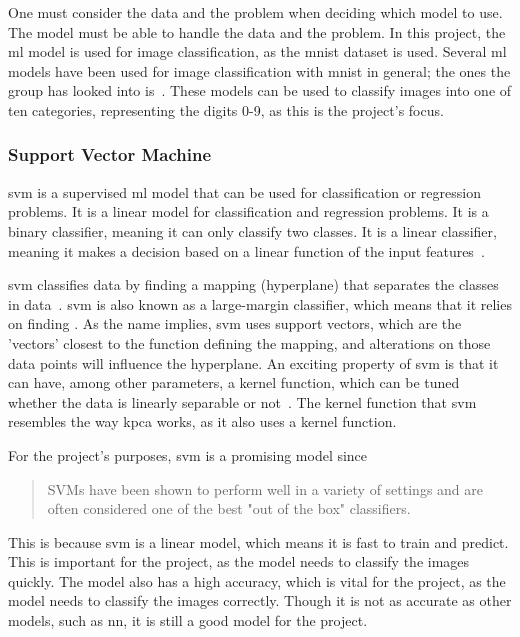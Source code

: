 One must consider the data and the problem when deciding which model to use. The model must be able to handle the data and the problem. In this project, the \gls{ml} model is used for image classification, as the \gls{mnist} dataset is used. Several \gls{ml} models have been used for image classification with \gls{mnist} in general; the ones the group has looked into is~\cite{lecun-mnist-database,IBM-computer-vision,convolutional-neural-networks-convnets,multi-column-neural-network-ciregan}. These models can be used to classify images into one of ten categories, representing the digits 0-9, as this is the project's focus.

\subsubsection{Support Vector Machine}\label{subsubsec:support-vector-machine}
\gls{svm} is a supervised \gls{ml} model that can be used for classification or regression problems. It is a linear model for classification and regression problems. It is a binary classifier, meaning it can only classify two classes. It is a linear classifier, meaning it makes a decision based on a linear function of the input features~\cite{james-statistical-learning1}.

\gls{svm} classifies data by finding a mapping (hyperplane) that separates the classes in data~\cite{faster-svm}. \gls{svm} is also known as a large-margin classifier, which means that it relies on finding . As the name implies, \gls{svm} uses support vectors, which are the 'vectors' closest to the function defining the mapping, and alterations on those data points will influence the hyperplane.
An exciting property of \gls{svm} is that it can have, among other parameters, a kernel function, which can be tuned whether the data is linearly separable or not~\cite{faster-svm}. The kernel function that \gls{svm} resembles the way \gls{kpca} works, as it also uses a kernel function.

For the project's purposes, \gls{svm} is a promising model since 

\blockcquote{james-statistical-learning1}{SVMs have been shown to perform well in a variety of settings and are often considered one of the best "out of the box" classifiers.}

This is because \gls{svm} is a linear model, which means it is fast to train and predict. This is important for the project, as the model needs to classify the images quickly. The model also has a high accuracy, which is vital for the project, as the model needs to classify the images correctly. Though it is not as accurate as other models, such as \gls{nn}, it is still a good model for the project. 

